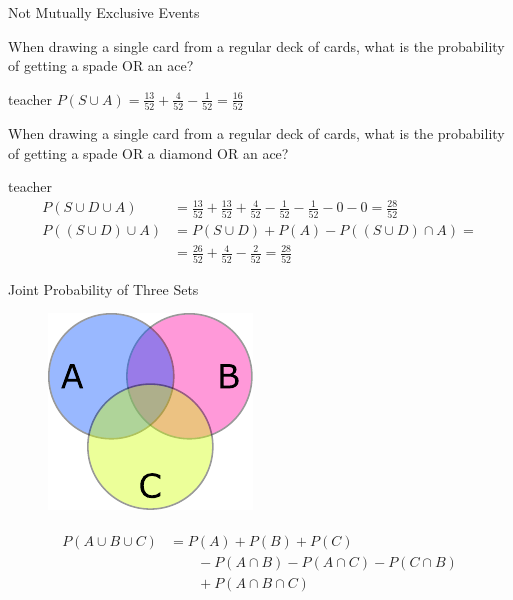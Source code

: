 \begin{frame}{Not Mutually Exclusive Events}

    \begin{example}
        \medskip
        When drawing a single card from a regular deck of cards, what is the probability of getting a spade OR an ace?
    \end{example}
    \begin{shownto}{teacher}
        \pause
        $P(S \cup A) = \frac{13}{52} + \frac{4}{52} - \frac{1}{52} = \frac{16}{52} $
        \pause
    \end{shownto}
    
    \begin{example}
        \medskip
        When drawing a single card from a regular deck of cards, what is the probability of getting a spade OR a diamond OR an ace?
    \end{example}
    \begin{shownto}{teacher}
        \pause
        \begin{align*}
        P(S \cup D \cup A) &= \frac{13}{52} + \frac{13}{52} + \frac{4}{52} - \frac{1}{52} - \frac{1}{52} - 0 - 0 = \frac{28}{52}\\
        P((S \cup D) \cup A ) &= P(S \cup D) + P(A) - P((S \cup D) \cap A) =\\
                             &= \frac{26}{52} + \frac{4}{52} - \frac{2}{52} = \frac{28}{52}
        \end{align*}
    \end{shownto}

\end{frame}

\begin{frame}{Joint Probability of Three Sets}
    \begin{figure}
        \includegraphics[width=0.4\linewidth]{gfx/sets_ABC}
    \end{figure}
    \begin{align}
    \begin{split}
    P(A \cup B \cup C) &= P(A) + P(B) + P(C)\\
                       &\qquad - P(A \cap B) - P(A \cap C) - P(C \cap B)\\
                       &\qquad + P(A \cap B \cap C)
    \end{split}
    \end{align}
\end{frame}

